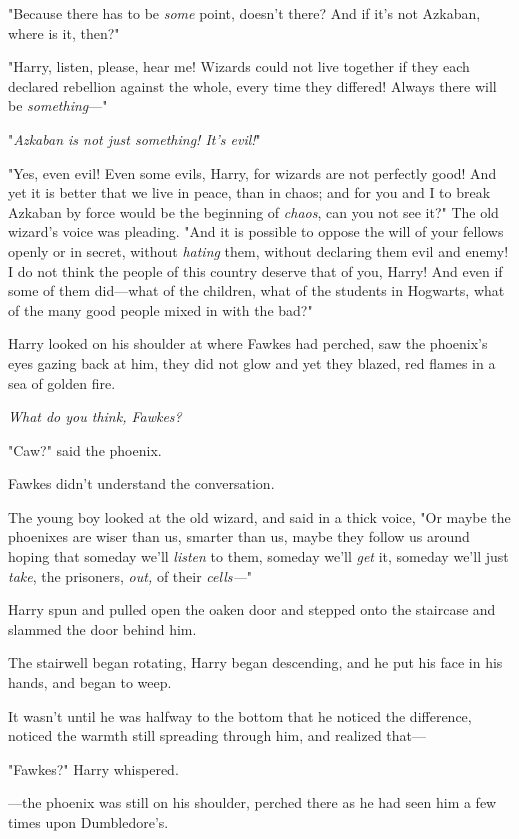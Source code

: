 "Because there has to be \emph{some} point, doesn't there? And if it's not
Azkaban, where is it, then?"

"Harry, listen, please, hear me! Wizards could not live together if they each
declared rebellion against the whole, every time they differed! Always there
will be \emph{something}---"

"\emph{Azkaban is not just something! It's evil!}"

"Yes, even evil! Even some evils, Harry, for wizards are not perfectly good!
And yet it is better that we live in peace, than in chaos; and for you and I to
break Azkaban by force would be the beginning of \emph{chaos}, can you not see
it?" The old wizard's voice was pleading. "And it is possible to oppose the
will of your fellows openly or in secret, without \emph{hating} them, without
declaring them evil and enemy! I do not think the people of this country
deserve that of you, Harry! And even if some of them did---what of the
children, what of the students in Hogwarts, what of the many good people mixed
in with the bad?"

Harry looked on his shoulder at where Fawkes had perched, saw the phoenix's
eyes gazing back at him, they did not glow and yet they blazed, red flames in a
sea of golden fire.

\emph{What do you think, Fawkes?}

"Caw?" said the phoenix.

Fawkes didn't understand the conversation.

The young boy looked at the old wizard, and said in a thick voice, "Or maybe
the phoenixes are wiser than us, smarter than us, maybe they follow us around
hoping that someday we'll \emph{listen} to them, someday we'll \emph{get} it,
someday we'll just \emph{take}, the prisoners, \emph{out,} of their
\emph{cells---}"

Harry spun and pulled open the oaken door and stepped onto the staircase and
slammed the door behind him.

The stairwell began rotating, Harry began descending, and he put his face in
his hands, and began to weep.

It wasn't until he was halfway to the bottom that he noticed the difference,
noticed the warmth still spreading through him, and realized that---

"Fawkes?" Harry whispered.

---the phoenix was still on his shoulder, perched there as he had seen him a
few times upon Dumbledore's.

